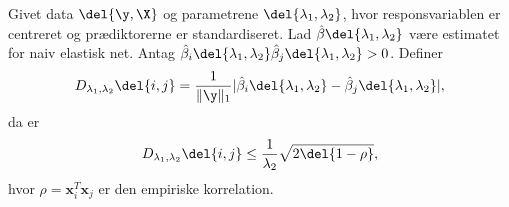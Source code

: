 \begin{thm} \label{thm:elastisk_net}
Givet data \(\del{\y, \X}\) og parametrene \(\del{\lambda_1, \lambda_2}\), hvor responsvariablen er centreret og prædiktorerne er standardiseret.
Lad \(\hat{\beta} \del{\lambda_1, \lambda_2}\) være estimatet for naiv elastisk net.
Antag \(\hat{\beta}_i \del{\lambda_1, \lambda_2} \hat{\beta}_j \del{\lambda_1, \lambda_2} > 0\).
Definer
\begin{align*}
D_{\lambda_1, \lambda_2} \del{i,j} = \frac{1}{\Vert \y \Vert_1} \vert \hat{\beta}_i \del{\lambda_1, \lambda_2} - \hat{\beta}_j \del{\lambda_1, \lambda_2} \vert,
\end{align*}
da er
\begin{align}
D_{\lambda_1, \lambda_2} \del{i,j} \leq \frac{1}{\lambda_2} \sqrt{2 \del{1-\rho}}, \label{eq:EN5}
\end{align}
hvor \(\rho = \mathbf{x}_i^T \mathbf{x}_j\) er den empiriske korrelation.
\end{thm}
